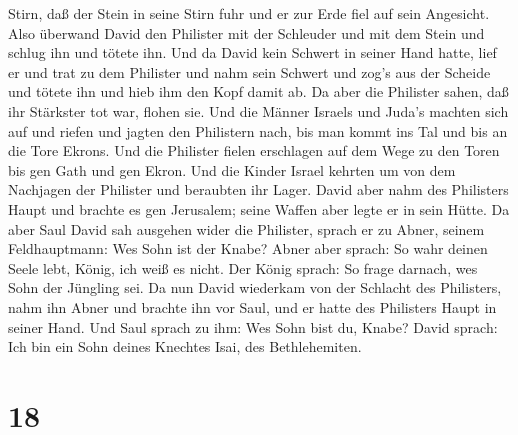 Stirn, daß der Stein in seine Stirn fuhr und er zur Erde fiel auf sein
Angesicht.  Also überwand David den Philister mit der
Schleuder und mit dem Stein und schlug ihn und tötete ihn. Und da David
kein Schwert in seiner Hand hatte,  lief er und trat zu dem
Philister und nahm sein Schwert und zog's aus der Scheide und tötete ihn
und hieb ihm den Kopf damit ab. Da aber die Philister sahen, daß ihr
Stärkster tot war, flohen sie.  Und die Männer Israels und
Juda's machten sich auf und riefen und jagten den Philistern nach, bis
man kommt ins Tal und bis an die Tore Ekrons. Und die Philister fielen
erschlagen auf dem Wege zu den Toren bis gen Gath und gen Ekron.
 Und die Kinder Israel kehrten um von dem Nachjagen der
Philister und beraubten ihr Lager.  David aber nahm des
Philisters Haupt und brachte es gen Jerusalem; seine Waffen aber legte
er in sein Hütte.  Da aber Saul David sah ausgehen wider
die Philister, sprach er zu Abner, seinem Feldhauptmann: Wes Sohn ist
der Knabe? Abner aber sprach: So wahr deinen Seele lebt, König, ich weiß
es nicht.  Der König sprach: So frage darnach, wes Sohn der
Jüngling sei.  Da nun David wiederkam von der Schlacht des
Philisters, nahm ihn Abner und brachte ihn vor Saul, und er hatte des
Philisters Haupt in seiner Hand.  Und Saul sprach zu ihm:
Wes Sohn bist du, Knabe? David sprach: Ich bin ein Sohn deines Knechtes
Isai, des Bethlehemiten.

\hypertarget{section-17}{%
\section{18}\label{section-17}}

